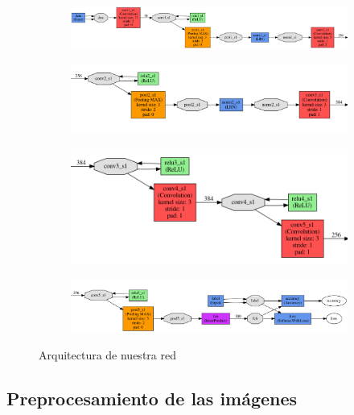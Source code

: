 \documentclass[10pt,a4paper]{article}
\begin{document}
\begin{figure}[h]
	\centering
	\begin{subfigure}{\textwidth}
		\includegraphics[width=\textwidth]{sc_model1}
	\end{subfigure}
	\begin{subfigure}{0.8\textwidth}
		\includegraphics[width=\textwidth]{sc_model2}
	\end{subfigure}
	\begin{subfigure}{0.6\textwidth}
		\includegraphics[width=\textwidth]{sc_model3}
	\end{subfigure}
	\begin{subfigure}{0.9\textwidth}
		\includegraphics[width=\textwidth]{sc_model4}
	\end{subfigure}
	\caption{Arquitectura de nuestra red}
	\label{fig:arquitectura_sc}
\end{figure}



\subsection{Preprocesamiento de las imágenes}
\end{document}
